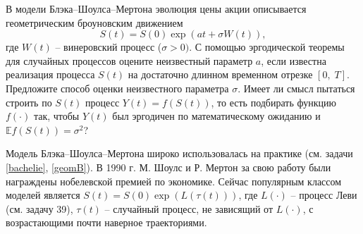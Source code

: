 \begin{problem} В модели Блэка--Шоулса--Мертона эволюция цены акции 
описывается геометрическим броуновским движением $$S\left( t \right)=S\left( 
0 \right)\exp \left( {at+\sigma W\left( t \right)} \right),$$ где $W\left( t 
\right)$ -- винеровский процесс ($\sigma >0)$. С помощью эргодической теоремы 
для случайных процессов оцените неизвестный параметр $a$, если известна 
реализация процесса $S\left( t \right)$ на достаточно длинном временном 
отрезке $\left[ {0,\;T} \right]$. Предложите способ оценки неизвестного 
параметра $\sigma $. Имеет ли смысл пытаться строить по $S\left( t \right)$ 
процесс $Y\left( t \right)=f\left( {S\left( t \right)} \right)$, то есть подбирать 
функцию $f(\cdot)$ так, чтобы $Y\left( t \right)$ был 
эргодичен по математическому ожиданию и $\mathbb{E}f\left( {S\left( t \right)} 
\right)=\sigma ^2$?
\end{problem}
\begin{remark}



Модель Блэка--Шоулса--Мертона широко использовалась на практике (см. задачи \ref{bachelie}, \ref{geomB}). В 1990 г. М. 
Шоулс и Р. Мертон за свою работу были награждены нобелевской премией по 
экономике. Сейчас популярным классом моделей является $S\left( t 
\right)=S\left( 0 \right)\exp \left( {L\left( {\tau \left( t \right)} 
\right)} \right)$, где $L(\cdot)$ -- процесс Леви (см. задачу 39), $\tau 
\left( t \right)$ -- случайный процесс, не зависящий от $L(\cdot)$, с возрастающими почти наверное траекториями.
\end{remark}

